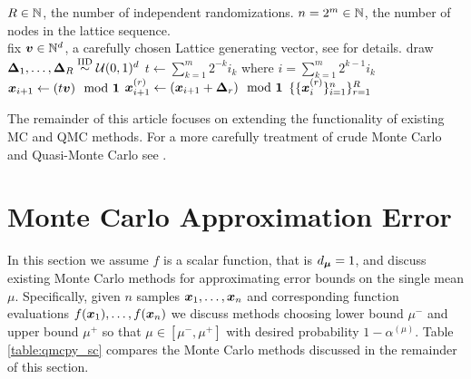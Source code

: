 \documentclass{article}[12pt]
\begin{document}
\begin{algorithm}[h!]
    \caption{$\texttt{Gen.Lattice}(R,n)$}
    \label{algo:Gen.Lattice}
    \begin{algorithmic}
    \Require $R \in \mathbb{N}$, the number of independent randomizations.
    \Require $n = 2^m \in \mathbb{N}$, the number of nodes in the lattice sequence.
    \\ \hrulefill
    \State fix $\boldsymbol{v} \in \mathbb{N}^{d}$, a carefully chosen Lattice generating vector, see \cite{cools2006constructing,hickernell2000extensible} for details. 
    \State draw $\boldsymbol{\Delta}_1,\dots,\boldsymbol{\Delta}_R \overset{\text{IID}}{\sim} \mathcal{U}(0,1)^{d}$
        \State $t \gets \sum_{k=1}^m 2^{-k}i_k$ where $i = \sum_{k=1}^m 2^{k-1} i_k$ 
        \State $\boldsymbol{x}_{i+1} \gets (t\boldsymbol{v}) \mod \boldsymbol{1}$
            \State $\boldsymbol{x}_{i+1}^{(r)} \gets (\boldsymbol{x}_{i+1}+\boldsymbol{\Delta}_r) \mod \boldsymbol{1}$
        \EndFor
    \EndFor
    \State \Return $\{\{\boldsymbol{x}_i^{(r)}\}_{i=1}^n\}_{r=1}^R$
    \end{algorithmic}
\end{algorithm}
    
The remainder of this article focuses on extending the functionality of existing MC and QMC methods. For a more carefully treatment of crude Monte Carlo and Quasi-Monte Carlo see \cite{mcbook}. 

\section{Monte Carlo Approximation Error}\label{sec:Existing_QMC_Methods}

In this section we assume $f$ is a scalar function, that is $d_{\boldsymbol{\mu}}=1$, and discuss existing Monte Carlo methods for approximating error bounds on the single mean $\mu$. Specifically, given $n$ samples $\boldsymbol{x}_1,\dots,\boldsymbol{x}_n$ and  corresponding function evaluations $f(\boldsymbol{x}_1),\dots,f(\boldsymbol{x}_n)$ we discuss methods choosing lower bound $\mu^-$ and upper bound $\mu^+$ so that $\mu \in [\mu^-,\mu^+]$ with desired probability $1-\alpha^{(\mu)}$. Table \ref{table:qmcpy_sc} compares the Monte Carlo methods discussed in the remainder of this section.
\end{document}
